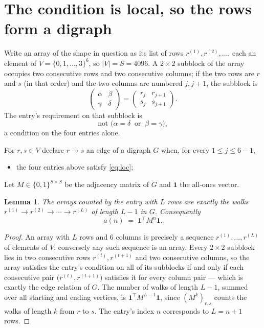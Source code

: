 \documentclass[11pt,a4paper]{article}
\theoremstyle{plain}
\newtheorem{lemma}[theorem]{Lemma}
\theoremstyle{definition}
\begin{document}
\section{The condition is local, so the rows form a digraph}

Write an array of the shape in question as its list of rows
$r^{(1)},r^{(2)},\dots$, each an element of
$V=\{0,1,\dots,3\}^{6}$, so $|V|=S=4096$. A $2\times2$ subblock of the array
occupies two consecutive rows and two consecutive columns; if the two rows are $r$
and $s$ (in that order) and the two columns are numbered $j,j+1$,
the subblock is
\[
\begin{pmatrix}\alpha&\beta\\\gamma&\delta\end{pmatrix}=\begin{pmatrix}r_j&r_{j+1}\\s_j&s_{j+1}\end{pmatrix}.
\]
The entry's requirement on that subblock is
\begin{equation}\label{eq:loc}
\text{not }\bigl(\alpha=\delta\ \text{ or }\ \beta=\gamma\bigr),
\end{equation}
a condition on the four entries alone.

For $r,s\in V$ declare $r\to s$ an edge of a digraph $G$ when, for every
$1\le j\le 6-1$,
\begin{itemize}
\item the four entries above satisfy \eqref{eq:loc};

\end{itemize}
Let $M\in\{0,1\}^{S\times S}$ be the adjacency matrix of $G$ and $\mathbf{1}$ the
all-ones vector.

\begin{lemma}\label{lem:walk}
The arrays counted by the entry with $L$ rows are exactly the walks
$r^{(1)}\to r^{(2)}\to\cdots\to r^{(L)}$ of length $L-1$ in $G$. Consequently
\[
a(n)\;=\;\mathbf{1}^{\!\top}M^{n}\mathbf{1} .
\]
\end{lemma}

\begin{proof}
An array with $L$ rows and $6$ columns is precisely a sequence
$r^{(1)},\dots,r^{(L)}$ of elements of $V$; conversely any such sequence is an array.
Every $2\times2$ subblock lies in two consecutive rows $r^{(t)},r^{(t+1)}$ and two
consecutive columns, so the array satisfies the entry's condition on all of its subblocks
if and only if each consecutive pair $\bigl(r^{(t)},r^{(t+1)}\bigr)$ satisfies it for
every column pair --- which is exactly the edge relation of $G$. The number of walks of
length $L-1$, summed over all starting and ending vertices, is
$\mathbf{1}^{\!\top}M^{L-1}\mathbf{1}$, since $(M^{k})_{r,s}$ counts the walks of
length $k$ from $r$ to $s$. The entry's index $n$ corresponds to $L=n+1$ rows.
\end{proof}
\end{document}
